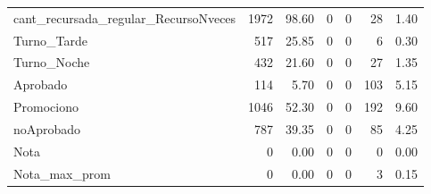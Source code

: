\begin{table}[!h]
{\begin{tabular}[t]{lrrrrrr}
			\addlinespace
			cant\_recursada\_regular\_RecursoNveces & 1972 & 98.60 & 0 & 0 & 28 & 1.40\\
			\rowcolor{gray!6}  Turno\_Tarde & 517 & 25.85 & 0 & 0 & 6 & 0.30\\
			Turno\_Noche & 432 & 21.60 & 0 & 0 & 27 & 1.35\\
			\rowcolor{gray!6}  Aprobado & 114 & 5.70 & 0 & 0 & 103 & 5.15\\
			Promociono & 1046 & 52.30 & 0 & 0 & 192 & 9.60\\
			\addlinespace
			\rowcolor{gray!6}  noAprobado & 787 & 39.35 & 0 & 0 & 85 & 4.25\\
			Nota & 0 & 0.00 & 0 & 0 & 0 & 0.00\\
			\rowcolor{gray!6}  Nota\_max\_prom & 0 & 0.00 & 0 & 0 & 3 & 0.15\\
			\bottomrule
	\end{tabular}}
\end{table}